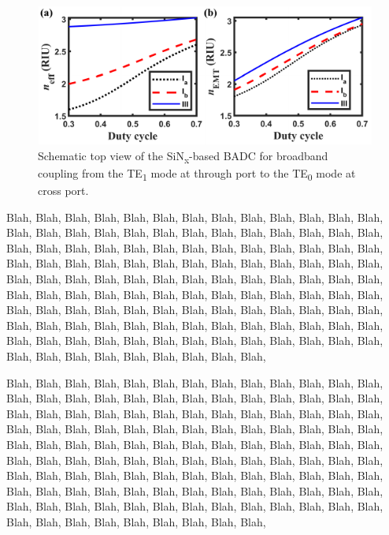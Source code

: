 \documentclass[lettersize,journal]{IEEEtran}
\def\SB#1{\textsubscript{#1}}
\begin{document}
    \begin{figure}[!t]
		\includegraphics{Fig_sample.pdf}
		\centering
		\caption{\label{fig:BADCsche}Schematic top view of the SiN\SB{x}-based BADC for broadband coupling 
                    from the TE\SB{1} mode at through port to the TE\SB{0} mode at cross port.}
	\end{figure}
    Blah, Blah, Blah, Blah, Blah, Blah, Blah, Blah, Blah, Blah, Blah, Blah, Blah, Blah, Blah, Blah, Blah, Blah, 
    Blah, Blah, Blah, Blah, Blah, Blah, Blah, Blah, Blah, Blah, Blah, Blah, Blah, Blah, Blah, Blah, Blah, Blah, 
    Blah, Blah, Blah, Blah, Blah, Blah, Blah, Blah, Blah, Blah, Blah, Blah, Blah, Blah, Blah, Blah, Blah, Blah, 
    Blah, Blah, Blah, Blah, Blah, Blah, Blah, Blah, Blah, Blah, Blah, Blah, Blah, Blah, Blah, Blah, Blah, Blah, 
    Blah, Blah, Blah, Blah, Blah, Blah, Blah\cite{hqp-1}, Blah, Blah, Blah, Blah, Blah, Blah, Blah, Blah, Blah, Blah, Blah, 
    Blah, Blah, Blah, Blah, Blah, Blah, Blah, Blah, Blah, Blah, Blah, Blah, Blah, Blah, Blah, Blah, Blah, Blah, 
    Blah, Blah, Blah, Blah, Blah, Blah, Blah, Blah, Blah, Blah, Blah, Blah, Blah, Blah, Blah, Blah, Blah, Blah, 
    
    Blah, Blah, Blah, Blah, Blah, Blah, Blah, Blah, Blah, Blah, Blah, Blah, Blah, Blah, Blah, Blah, Blah, Blah, 
    Blah, Blah, Blah, Blah, Blah, Blah, Blah, Blah, Blah, Blah, Blah, Blah, Blah, Blah, Blah, Blah, Blah, Blah, 
    Blah, Blah, Blah, Blah, Blah, Blah, Blah, Blah, Blah, Blah, Blah, Blah, Blah, Blah, Blah, Blah, Blah, Blah, 
    Blah, Blah, Blah, Blah, Blah, Blah, Blah, Blah, Blah, Blah, Blah, Blah, Blah, Blah, Blah, Blah, Blah, Blah, 
    Blah, Blah, Blah, Blah, Blah, Blah, Blah, Blah, Blah, Blah, Blah, Blah, Blah, Blah, Blah, Blah, Blah, Blah, 
    Blah, Blah, Blah, Blah, Blah, Blah, Blah, Blah, Blah, Blah, Blah, Blah, Blah, Blah, Blah, Blah, Blah, Blah, 
    Blah, Blah, Blah, Blah, Blah, Blah, Blah, Blah, Blah, Blah, Blah, Blah, Blah, Blah, Blah, Blah, Blah, Blah, 
    
\end{document}
